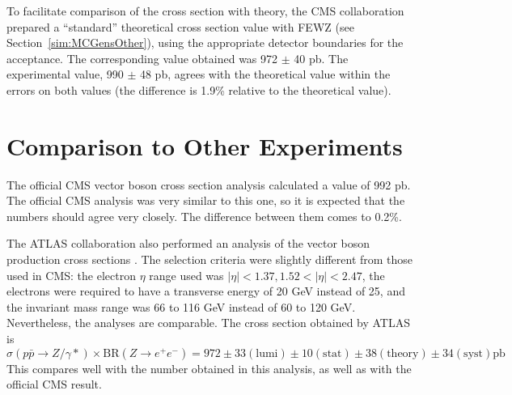 To facilitate comparison of the cross section 
with theory, 
the CMS collaboration prepared a ``standard'' 
theoretical cross section value with FEWZ 
(see Section~\ref{sim:MCGensOther}), 
using the appropriate detector boundaries 
for the acceptance.  
The corresponding value obtained was 
972 $\pm$ 40 pb.  
The experimental value, 990 $\pm$ 48 pb, 
agrees with the theoretical value within 
the errors on both values 
(the difference is 1.9\% relative 
to the theoretical value).  


\section{Comparison to Other Experiments}
\label{res:prev}


The official CMS vector boson cross section analysis 
\cite{CMSWZ}  
calculated a value of 992 pb.  
The official CMS analysis was very similar 
to this one, 
so it is expected that the numbers should 
agree very closely.  
The difference between them comes to 0.2\%.  

The ATLAS collaboration also performed an analysis 
of the vector boson production cross sections 
\cite{ATLASZ}. 
The selection criteria were slightly different 
from those used in CMS: 
the electron $\eta$ range used was 
$|\eta| < 1.37, 1.52 < |\eta| < 2.47$, 
the electrons were required to have a 
transverse energy of 20 GeV instead of 25, 
and the invariant mass range was 66 to 116 GeV 
instead of 60 to 120 GeV.  
Nevertheless, the analyses are comparable.  
The \Zee cross section obtained by ATLAS is 
\[
\sigma(p \bar{p} \rightarrow Z/\gamma *) \times \mathrm{BR}(Z \rightarrow e^+ e^- )
= 972 \pm 33 \mathrm{(lumi)} \pm 10 \mathrm{(stat)} \pm 38 \mathrm{(theory)} \pm 34 \mathrm{(syst)} \mathrm{pb} 
\]
This compares well with the number obtained 
in this analysis, 
as well as with the official CMS result.  



\clearpage